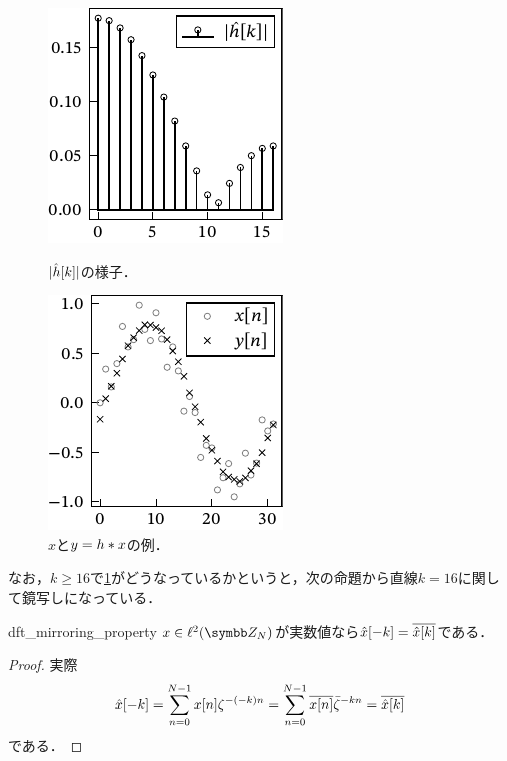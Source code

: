 \documentclass[../../main]{subfiles}
\begin{document}
\begin{figure}[htbp]
  \begin{minipage}{\linewidth/2}
    \centering
    \includegraphics{figures/filter_characteristics.pdf}
    \caption{\(\lvert\hat{h}[k]\rvert\)の様子．}
    \label{figure:filter_characteristics}
    \end{minipage}%
  \begin{minipage}{\linewidth/2}
    \centering
    \includegraphics{figures/filtering.pdf}
    \caption{\(x\)と\(y=h\ast x\)の例．}
  \end{minipage}
\end{figure}

なお，\(k\geq 16\)で\cref{figure:filter_characteristics}がどうなっているかというと，次の命題から直線\(k=16\)に関して鏡写しになっている．

\begin{proposition}{}{dft_mirroring_property}
  \(x\in\cycles{N}\)が実数値なら\(\hat{x}[-k]=\conj*{\hat{x}[k]}\)である．
\end{proposition}

\begin{proof}
  実際
  \[
    \hat{x}[-k] = \sum_{n=0}^{N-1}x[n]\zeta^{-(-k)n}
    = \sum_{n=0}^{N-1}\conj*{x[n]}\conj{\zeta}^{-kn}
    = \conj*{\hat{x}[k]}
  \]
  である．
\end{proof}
\end{document}
